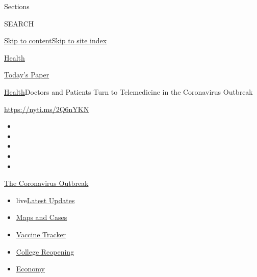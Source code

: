 Sections

SEARCH

\protect\hyperlink{site-content}{Skip to
content}\protect\hyperlink{site-index}{Skip to site index}

\href{https://www.nytimes3xbfgragh.onion/section/health}{Health}

\href{https://myaccount.nytimes3xbfgragh.onion/auth/login?response_type=cookie\&client_id=vi}{}

\href{https://www.nytimes3xbfgragh.onion/section/todayspaper}{Today's
Paper}

\href{/section/health}{Health}\textbar{}Doctors and Patients Turn to
Telemedicine in the Coronavirus Outbreak

\url{https://nyti.ms/2Q6nYKN}

\begin{itemize}
\item
\item
\item
\item
\item
\end{itemize}

\href{https://www.nytimes3xbfgragh.onion/news-event/coronavirus?action=click\&pgtype=Article\&state=default\&region=TOP_BANNER\&context=storylines_menu}{The
Coronavirus Outbreak}

\begin{itemize}
\tightlist
\item
  live\href{https://www.nytimes3xbfgragh.onion/2020/08/03/world/coronavirus-covid-19.html?action=click\&pgtype=Article\&state=default\&region=TOP_BANNER\&context=storylines_menu}{Latest
  Updates}
\item
  \href{https://www.nytimes3xbfgragh.onion/interactive/2020/us/coronavirus-us-cases.html?action=click\&pgtype=Article\&state=default\&region=TOP_BANNER\&context=storylines_menu}{Maps
  and Cases}
\item
  \href{https://www.nytimes3xbfgragh.onion/interactive/2020/science/coronavirus-vaccine-tracker.html?action=click\&pgtype=Article\&state=default\&region=TOP_BANNER\&context=storylines_menu}{Vaccine
  Tracker}
\item
  \href{https://www.nytimes3xbfgragh.onion/2020/08/02/us/covid-college-reopening.html?action=click\&pgtype=Article\&state=default\&region=TOP_BANNER\&context=storylines_menu}{College
  Reopening}
\item
  \href{https://www.nytimes3xbfgragh.onion/live/2020/08/03/business/stock-market-today-coronavirus?action=click\&pgtype=Article\&state=default\&region=TOP_BANNER\&context=storylines_menu}{Economy}
\end{itemize}

